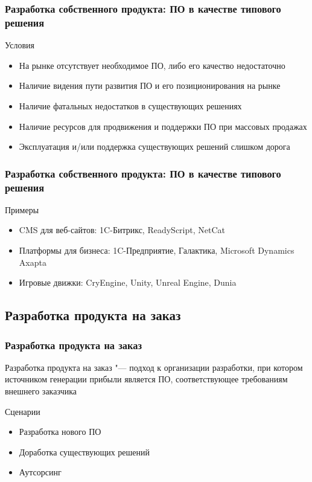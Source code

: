 \documentclass{../industrial-development}
\begin{document}
\begin{frame} \frametitle{Разработка собственного продукта: ПО в качестве типового решения}
	\begin{block}{Условия}
		\begin{itemize}
			\item На рынке отсутствует необходимое ПО, либо его качество недостаточно
			\item Наличие видения пути развития ПО и его позиционирования на рынке
			\item Наличие фатальных недостатков в существующих решениях
			\item Наличие ресурсов для продвижения и поддержки ПО при массовых продажах
			\item Эксплуатация и/или поддержка существующих решений слишком дорога
		\end{itemize}
	\end{block}
\end{frame}


\begin{frame} \frametitle{Разработка собственного продукта: ПО в качестве типового решения}
	\begin{block}{Примеры}
		\begin{itemize}
			\item CMS для веб-сайтов: 1C-Битрикс, ReadyScript, NetCat
			\item Платформы для бизнеса: 1C-Предприятие, Галактика, Microsoft Dynamics Axapta
			\item Игровые движки: CryEngine, Unity, Unreal Engine, Dunia
		\end{itemize}
	\end{block}
\end{frame}


\subsection{Разработка продукта на заказ}


\begin{frame} \frametitle{Разработка продукта на заказ}
	\begin{block}{}
		\alert{Разработка продукта на заказ} "--- подход к организации разработки, при котором источником генерации прибыли является ПО, соответствующее требованиям внешнего заказчика
	\end{block}
	\begin{block}{Сценарии}
		\begin{itemize}
			\item Разработка нового ПО
			\item Доработка существующих решений
			\item Аутсорсинг
		\end{itemize}
	\end{block}
\end{frame}
\end{document}
